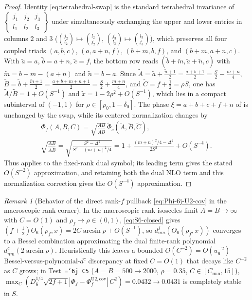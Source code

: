 \documentclass[11pt]{article}
\theoremstyle{definition}
\theoremstyle{remark}
\newtheorem{remark}[theorem]{Remark}
\newcommand{\sixj}[6]{\begin{Bmatrix}#1&#2&#3\\#4&#5&#6\end{Bmatrix}}
\renewcommand{\_}{\oldunderscore\penalty0\hskip0pt\relax}
\let\oldtexttt\texttt
\renewcommand{\texttt}[1]{\oldtexttt{\hyphenchar\font=`\-\relax #1}}
\begin{document}
\begin{proof}
Identity \eqref{eq:tetrahedral-swap} is the standard tetrahedral invariance of $\sixj{j_1}{j_2}{j_3}{l_1}{l_2}{l_3}$ under
  simultaneously exchanging the upper and lower entries in columns $2$ and $3$ ($\binom{j_2}{l_2}\mapsto\binom{l_2}{j_2}$,
  $\binom{j_3}{l_3}\mapsto\binom{l_3}{j_3}$), which preserves all four coupled triads $(a,b,c)$, $(a,a+n,f)$, $(b+m,b,f)$, and
  $(b+m,a+n,c)$. With $\tilde{a}=a$, $\tilde{b}=a+n$, $\tilde{c}=f$, the bottom row reads
  $(\tilde{b}+\tilde{m},\tilde{a}+\tilde{n},c)$ with $\tilde{m}=b+m-(a+n)$ and $\tilde{n}=b-a$. Since
  $\tilde{A}=\tilde{a}+\frac{\tilde{n}+1}{2}=\frac{a+b+1}{2}=\frac{S}{2}-\frac{m+n}{4}$,
  $\tilde{B}=\tilde{b}+\frac{\tilde{m}+1}{2}=\frac{a+b+m+n+1}{2}=\frac{S}{2}+\frac{m+n}{4}$, and $\tilde{C}=f+\frac12=\rho S$,
  one has $\tilde{A}/\tilde{B}=1+O(S^{-1})$ and $\tilde{x}=1-2\rho^2+O(S^{-1})$, which lies in a compact subinterval of $(-1,1)$
  for $\rho\in[\rho_0,1-\delta_0]$. The phase $\xi=a+b+c+f+n$ of \cite[Eq.~(115)]{LewisFixedRank} is unchanged by the swap, while its
  centered normalization changes by
\begin{equation}
\begin{gathered}
\Phi_f(A,B,C)=\sqrt{\frac{AB}{\tilde A\tilde B}}\,\widetilde\Phi_c(\tilde A,\tilde B,\tilde C),\\
\sqrt{\frac{AB}{\tilde A\tilde B}}=
\sqrt{\frac{S^2-\Delta^2}{S^2-(m+n)^2/4}}
=1+\frac{(m+n)^2/4-\Delta^2}{2S^2}+O(S^{-4}).
\end{gathered}
\end{equation}
Thus \cite[Corollary~10.3]{LewisFixedRank} applies to the fixed-rank dual symbol; its leading term gives the stated $O(S^{-2})$
  approximation, and retaining both the dual NLO term and this normalization correction gives the $O(S^{-4})$ approximation.
\end{proof}

\begin{remark}[Behavior of the direct rank-$f$ pullback \eqref{eq:Phi-6j-U2-cov} in the macroscopic-rank corner]
\label{rem:direct-rank-f-corner}
In the macroscopic-rank isosceles limit $A=B\to\infty$ with $C=O(1)$ and $\rho_f\to\rho\in(0,1)$, \eqref{eq:S6-closed} gives
  $(f+\frac12)\Theta_6(\rho_f,x)=2C\arcsin\rho+O(S^{-1})$, so $d^f_{nm}(\Theta_6(\rho_f,x))$ converges to a Bessel combination
  approximating the dual finite-rank polynomial $d^c_{\tilde{n}\tilde{m}}(2\arcsin\rho)$. Heuristically this leaves a bounded
  $O(C^{-2})=O(u_6^{-2})$ Bessel-versus-polynomial-$d^c$ discrepancy at fixed $C=O(1)$ that decays like $C^{-2}$ as $C$ grows; in
  Test~\texttt{6j~C5} ($A=B=500\to 2000$, $\rho=0.35$, $C\in[C_{\min},15]$),
  $\max_C(D_6^{1/4}\sqrt{2f+1}|\Phi_f-\Phi_f^{\mathrm{U2,cov}}|\,C^2)=0.0432\to 0.0431$ is completely stable in $S$.
\end{remark}
\end{document}
